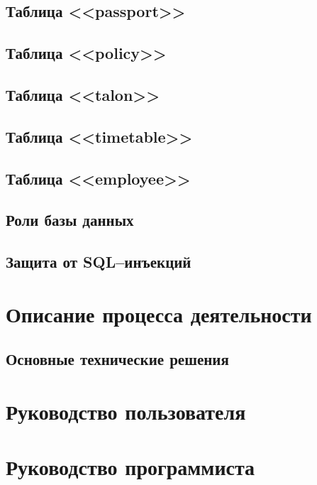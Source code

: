 \subsection{Таблица <<passport>>}

\subsection{Таблица <<policy>>}

\subsection{Таблица <<talon>>}

\subsection{Таблица <<timetable>>}

\subsection{Таблица <<employee>>}

\subsection{Роли базы данных}

\subsection{Защита от SQL–инъекций}


\clearpage
\section{Описание процесса деятельности} 
\setcounter{figure}{0}


\clearpage
\subsection{Основные технические решения}


\clearpage
\section{Руководство пользователя} 
\setcounter{figure}{0}


\clearpage
\section{Руководство программиста} 
\setcounter{figure}{0}




